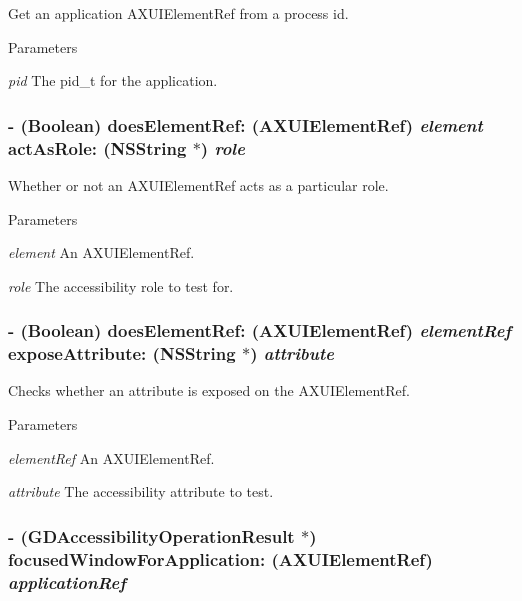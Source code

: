 Get an application AXUIElementRef from a process id. 
\begin{DoxyParams}{Parameters}
\item[{\em pid}]The pid\_\-t for the application. \end{DoxyParams}
\hypertarget{interface_g_d_accessibility_manager_ab01d89443568416b034e6a8750106ddb}{
\subsubsection[{doesElementRef:actAsRole:}]{\setlength{\rightskip}{0pt plus 5cm}-\/ (Boolean) doesElementRef: (AXUIElementRef) {\em element}\/ actAsRole: (NSString $\ast$) {\em role}}}
\label{interface_g_d_accessibility_manager_ab01d89443568416b034e6a8750106ddb}


Whether or not an AXUIElementRef acts as a particular role. 
\begin{DoxyParams}{Parameters}
\item[{\em element}]An AXUIElementRef. \item[{\em role}]The accessibility role to test for. \end{DoxyParams}
\hypertarget{interface_g_d_accessibility_manager_ad3fc09b2e6330989ea5bc28ba1ecdc9d}{
\subsubsection[{doesElementRef:exposeAttribute:}]{\setlength{\rightskip}{0pt plus 5cm}-\/ (Boolean) doesElementRef: (AXUIElementRef) {\em elementRef}\/ exposeAttribute: (NSString $\ast$) {\em attribute}}}
\label{interface_g_d_accessibility_manager_ad3fc09b2e6330989ea5bc28ba1ecdc9d}


Checks whether an attribute is exposed on the AXUIElementRef. 
\begin{DoxyParams}{Parameters}
\item[{\em elementRef}]An AXUIElementRef. \item[{\em attribute}]The accessibility attribute to test. \end{DoxyParams}
\hypertarget{interface_g_d_accessibility_manager_a91408e0f939f8976ee81b2883ecfeac2}{
\subsubsection[{focusedWindowForApplication:}]{\setlength{\rightskip}{0pt plus 5cm}-\/ ({\bf GDAccessibilityOperationResult} $\ast$) focusedWindowForApplication: (AXUIElementRef) {\em applicationRef}}}
\label{interface_g_d_accessibility_manager_a91408e0f939f8976ee81b2883ecfeac2}


